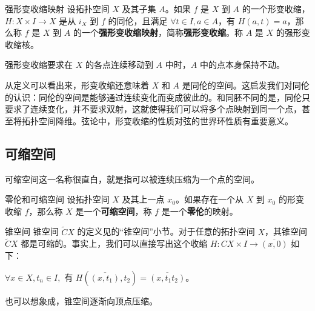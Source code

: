 \begin{definition}{强形变收缩映射}\label{def_HomT2_1}
设拓扑空间 $X$ 及其子集 $A$。如果 $f$ 是 $X$ 到 $A$ 的一个形变收缩，$H:X\times I\rightarrow X$ 是从 $i_X$ 到 $f$ 的同伦，且满足 $\forall t\in I, a\in A$，有 $H(a, t)=a$，那么称 $f$ 是 $X$ 到 $A$ 的一个\textbf{强形变收缩映射}，简称\textbf{强形变收缩}。称 $A$ 是 $X$ 的强形变收缩核。
\end{definition}

强形变收缩要求在 $X$ 的各点连续移动到 $A$ 中时，$A$ 中的点本身保持不动。

从定义可以看出来，形变收缩还意味着 $X$ 和 $A$ 是同伦的空间。这启发我们对同伦的认识：同伦的空间是能够通过连续变化而变成彼此的。和同胚不同的是，同伦只要求了连续变化，并不要求双射，这就使得我们可以将多个点映射到同一个点，甚至将拓扑空间降维。弦论中，形变收缩的性质对弦的世界环性质有重要意义。

\subsection{可缩空间}
可缩空间这一名称很直白，就是指可以被连续压缩为一个点的空间。

\begin{definition}{零伦和可缩空间}
设拓扑空间 $X$ 及其上一点 $x_0$。如果存在一个从 $X$ 到 $x_0$ 的形变收缩 $f$，那么称 $X$ 是一个\textbf{可缩空间}，称 $f$ 是一个\textbf{零伦}的映射。
\end{definition}

\begin{example}{锥空间}
锥空间 $\widetilde{C}X$ 的定义见的“锥空间”小节。对于任意的拓扑空间 $X$，其锥空间 $\widetilde{C}X$ 都是可缩的。事实上，我们可以直接写出这个收缩 $H:CX\times I\rightarrow\overline{(x, 0)}$ 如下：

$\forall x\in X, t_n\in I, $ 有 $H(\overline{(x, t_1)}, t_2)=\overline{(x, t_1t_2)}$。

也可以想象成，锥空间逐渐向顶点压缩。
\end{example}


